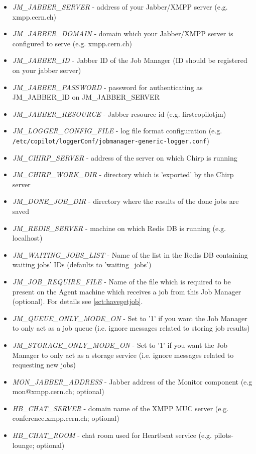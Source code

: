 \begin{itemize}
  \item \emph{JM\_JABBER\_SERVER} - address of your Jabber/XMPP server (e.g. xmpp.cern.ch)
  \item \emph{JM\_JABBER\_DOMAIN} - domain which your Jabber/XMPP server is configured to serve (e.g. xmpp.cern.ch)
  \item \emph{JM\_JABBER\_ID} - Jabber ID of the Job Manager (ID should be registered on your jabber server)
  \item \emph{JM\_JABBER\_PASSWORD} - password for authenticating as JM\_JABBER\_ID on JM\_JABBER\_SERVER
  \item \emph{JM\_JABBER\_RESOURCE} - Jabber resource id (e.g. firstcopilotjm)
  \item \emph{JM\_LOGGER\_CONFIG\_FILE} - log file format configuration (e.g. \texttt{/etc/copilot/loggerConf/jobmanager-generic-logger.conf})
  \item \emph{JM\_CHIRP\_SERVER} - address of the server on which Chirp is running
  \item \emph{JM\_CHIRP\_WORK\_DIR} - directory which is 'exported' by the Chirp server
  \item \emph{JM\_DONE\_JOB\_DIR} - directory where the results of the done jobs are saved
  \item \emph{JM\_REDIS\_SERVER} - machine on which Redis DB is running (e.g. localhost)
  \item \emph{JM\_WAITING\_JOBS\_LIST} - Name of the list in the Redis DB containing waiting jobs' IDs (defaults to 'waiting\_jobs')
  \item \emph{JM\_JOB\_REQUIRE\_FILE} - Name of the file which is required to be present on the Agent machine which receives a job from this Job Manager (optional). For details see \ref{sct:havegetjob}.
  \item \emph{JM\_QUEUE\_ONLY\_MODE\_ON} - Set to '1' if you want the Job Manager to only act as a job queue (i.e. ignore messages related to storing job results) 
  \item \emph{JM\_STORAGE\_ONLY\_MODE\_ON} - Set to '1' if you want the Job Manager to only act as a storage service (i.e. ignore messages related to requesting new jobs) 
  \item \emph{MON\_JABBER\_ADDRESS} - Jabber address of the Monitor component (e.g mon@xmpp.cern.ch; optional)
  \item \emph{HB\_CHAT\_SERVER} - domain name of the XMPP MUC server (e.g. conference.xmpp.cern.ch; optional)
  \item \emph{HB\_CHAT\_ROOM} - chat room used for Heartbeat service (e.g. pilots-lounge; optional)
 \end{itemize}

